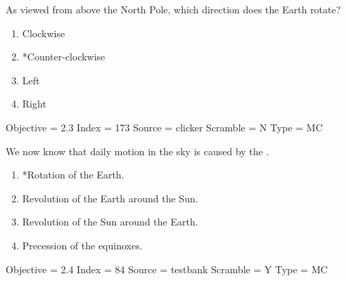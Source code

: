 \documentclass[11pt]{article}
\begin{document}
\begin{enumerate}
\begin{minipage}{\textwidth}
\begin{minipage}{\textwidth}
\item As viewed from above the North Pole, which direction does the Earth rotate?
\begin{multicols}{3}
\begin{enumerate} 
\setlength{\itemsep}{1pt} 
\setlength{\parskip}{0pt} 
\setlength{\parsep}{0pt}
\setlength{\multicolsep}{1pt} 
\item Clockwise
\item *Counter-clockwise
\item Left
\item Right
\end{enumerate} 
\vfill 
\end{multicols}

Objective = 2.3
Index = 173
Source = clicker
Scramble = N
Type = MC
\end{minipage}
\end{minipage}
\vskip 0.20in

\begin{minipage}{\textwidth}
\begin{minipage}{\textwidth}
\item We now know that daily motion in the sky is caused by the \underline{\hspace{0.5in}}.
\begin{multicols}{2}
\begin{enumerate} 
\setlength{\itemsep}{1pt} 
\setlength{\parskip}{0pt} 
\setlength{\parsep}{0pt}
\setlength{\multicolsep}{1pt} 
\item *Rotation of the Earth.
\item Revolution of the Earth around the Sun.
\item Revolution of the Sun around the Earth.
\item Precession of the equinoxes.
\end{enumerate} 
\vfill 
\end{multicols}

Objective = 2.4
Index = 84
Source = testbank
Scramble = Y
Type = MC
\end{minipage}
\end{minipage}
\vskip 0.20in


\end{enumerate}
\end{document}
